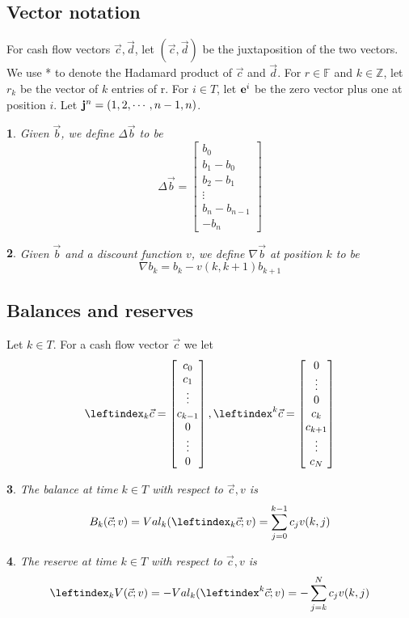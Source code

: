 \documentclass{article}
\newtheorem*{defn}{}
\begin{document}
\subsection{Vector notation}
For cash flow vectors $\vec{c},\vec{d}$, let $(\vec{c},\vec{d})$ be the juxtaposition of the two vectors. We use * to denote the Hadamard product of $\vec{c}$ and $\vec{d}$. For $r \in \mathbb{F}$ and $k \in \mathbb{Z}$, let $r_k$ be the vector of $k$ entries of r. For $i \in T$, let $\bold{e}^i$ be the zero vector plus one at position $i$. Let $\bold{j}^n = (1,2,\cdots,n-1,n)$.
\begin{defn}
Given $\vec{b}$, we define $\Delta \vec{b}$ to be
$$
\Delta{\vec{b}} =
\begin{bmatrix}
b_0 \\
b_1 - b_0 \\
b_2 - b_1 \\
\vdots \\
b_n - b_{n-1} \\
-b_n
\end{bmatrix}
$$
\end{defn}
\begin{defn}
Given $\vec{b}$ and a discount function $v$, we define $\nabla \vec{b}$ at position $k$ to be
$$
\nabla b_k = b_k - v(k, k+1)b_{k+1}
$$
\end{defn}
\subsection{Balances and reserves}
Let $k \in T$. For a cash flow vector $\vec{c}$ we let
$$
\leftindex_k{\vec{c}} =
\begin{bmatrix}
c_0 \\
c_1 \\
\vdots \\
c_{k-1} \\
0 \\
\vdots \\
0
\end{bmatrix},
\leftindex^k{\vec{c}} =
\begin{bmatrix}
0 \\
\vdots \\
0 \\
c_k \\
c_{k+1} \\
\vdots \\
c_N
\end{bmatrix}
$$
\begin{defn}
The balance at time $k \in T$ with respect to $\vec{c},v$ is
$$
B_k(\vec{c};v) = Val_k(\leftindex_k{\vec{c}};v)=\sum_{j=0}^{k-1} {c_j v(k,j)}
$$
\end{defn}
\begin{defn}
The reserve at time $k \in T$ with respect to $\vec{c},v$ is
$$
\leftindex_k{V}(\vec{c};v) = -Val_k(\leftindex^k{\vec{c}};v)=-\sum_{j=k}^{N} {c_j v(k,j)}
$$
\end{defn}
\end{document}
